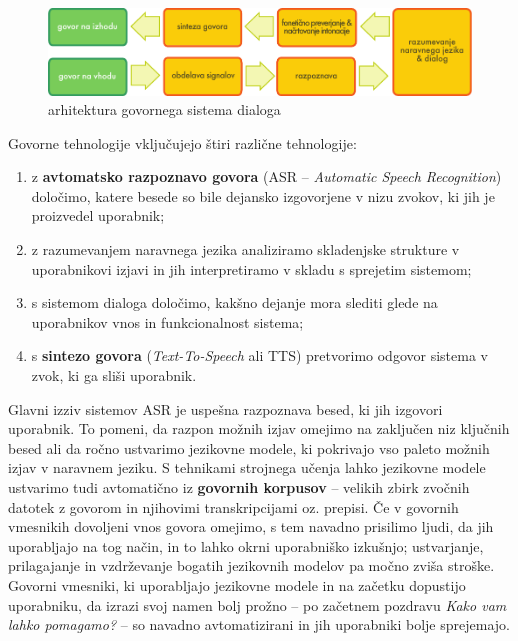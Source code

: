 \begin{multicols}{2}

\begin{figure}[htb]
  \center 
  \includegraphics[width=\textwidth]{../_media/slovene/simple_speech-based_dialogue_architecture}
  \caption{arhitektura govornega sistema dialoga}
  \label{fig:dialoguearch_de}
\end{figure}

Govorne tehnologije vključujejo štiri različne tehnologije:

\begin{enumerate}
\item z \textbf{avtomatsko razpoznavo govora} (ASR – \textit{Automatic Speech Recognition}) določimo, katere besede so bile dejansko izgovorjene v nizu zvokov, ki jih je proizvedel uporabnik;
\item z razumevanjem naravnega jezika analiziramo skladenjske strukture v uporabnikovi izjavi in jih interpretiramo v skladu s sprejetim sistemom;
\item s sistemom dialoga določimo, kakšno dejanje mora slediti glede na uporabnikov vnos in funkcionalnost sistema;
\item s \textbf{sintezo govora} (\textit{Text-To-Speech} ali TTS) pretvorimo odgovor sistema v zvok, ki ga sliši uporabnik.
\end{enumerate}

Glavni izziv sistemov ASR je uspešna razpoznava besed, ki jih izgovori uporabnik. To pomeni, da razpon možnih izjav omejimo na zaključen niz ključnih besed ali da ročno ustvarimo jezikovne modele, ki pokrivajo vso paleto možnih izjav v narav\-nem jeziku. S tehnikami strojnega učenja lahko jezikovne modele ustvarimo tudi avtomatično iz \textbf{govornih korpusov} – velikih zbirk zvočnih datotek z govorom in njihovimi transkripcijami oz. prepisi. Če v govornih vmesnikih dovoljeni vnos govora omejimo, s tem navadno prisilimo ljudi, da jih uporabljajo na tog način, in to lahko okrni uporabniško izkušnjo; ustvarjanje, prilagajanje in vzdrževanje bogatih jezikovnih modelov pa močno zviša stroške. Govorni vmesniki, ki uporabljajo jezikovne modele in na začetku dopustijo uporabniku, da izrazi svoj namen bolj prožno – po začetnem pozdravu \textit{Kako vam lahko pomagamo?} – so navadno avtomatizirani in jih uporabniki bolje sprejemajo.


\end{multicols}
